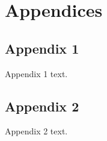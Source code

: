 \chapter{Appendices}

\section{Appendix 1}
\label{app:appendix1}
Appendix 1 text.
\section{Appendix 2}
\label{app:appendix2}
Appendix 2 text.